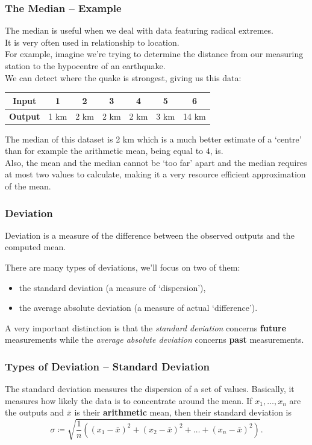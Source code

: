 \documentclass[aspectratio=169,11pt,svgnames]{beamer}
\begin{document}
\begin{frame}
 \frametitle{The Median -- Example}
 The median is useful when we deal with data featuring radical extremes.\\
 \pause
 It is very often used in relationship to \alert{location}.\\
 \pause
 For example, imagine we're trying to determine the distance from our measuring
 station to the hypocentre of an earthquake.\\
 \pause
 We can detect where the quake is strongest, giving us this data:
 \begin{center}
  \begin{tabular}{c|cccccc}
   \textbf{Input} & 1 & 2 & 3 & 4 & 5 & 6\\
   \midrule
   \textbf{Output} & 1 km & 2 km & 2 km & 2 km & 3 km & 14 km
  \end{tabular}
 \end{center}
 \pause
 The median of this dataset is 2 km which is a much better estimate of a
 `centre' than for example the arithmetic mean, being equal to $4$, is.\\
 \pause
 Also, the mean and the median cannot be `too far' apart and the median requires
 at most two values to calculate, making it a very resource efficient
 approximation of the mean.
\end{frame}

\begin{frame}
 \frametitle{Deviation}
 \begin{tcolorbox}[title=Deviation]
  \alert{Deviation} is a measure of the difference between the observed outputs
  and the computed mean.
 \end{tcolorbox}
 \pause
 There are many types of deviations, we'll focus on two of them:
 \pause
 \begin{itemize}
  \item the \alert{standard deviation} (a measure of `dispersion'),
  \pause
  \item the \alert{average absolute deviation} (a measure of actual
   `difference').
 \end{itemize}
 \pause
 A \alert{very important distinction} is that the \emph{standard deviation}
 concerns \textbf{future} measurements while the \emph{average absolute
 deviation} concerns \textbf{past} measurements.
\end{frame}

\begin{frame}
 \frametitle{Types of Deviation -- Standard Deviation}
 \begin{tcolorbox}[title=Standard Deviation]
  The \alert{standard deviation} measures the dispersion of a set of values.
  Basically, it measures how likely the data is to concentrate around the mean.
  If $x_1,\ldots,x_n$ are the outputs and $\bar{x}$ is their \textbf{arithmetic}
  mean, then their standard deviation is
  \[
   \sigma \coloneqq \sqrt{\frac{1}{n}((x_1-\bar{x})^2 +
   (x_2-\bar{x})^2+\ldots+(x_n-\bar{x})^2)}.
  \]
 \end{tcolorbox}
\end{frame}
\end{document}
